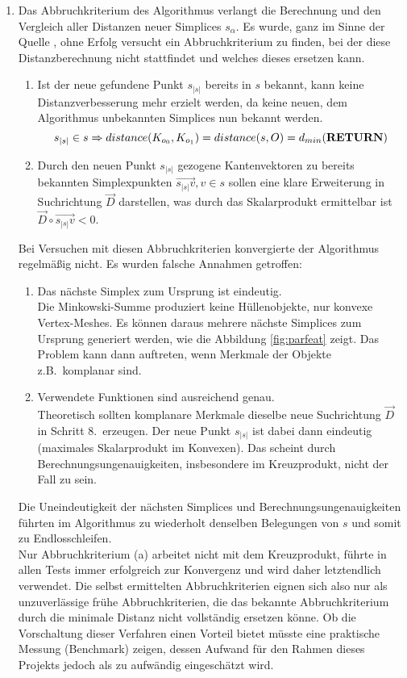 \begin{enumerate}
\item Das Abbruchkriterium des Algorithmus verlangt die Berechnung und den Vergleich aller Distanzen neuer Simplices $s_{\alpha}$. Es wurde, ganz im Sinne der Quelle \cite{gjk-casey}, ohne Erfolg versucht ein Abbruchkriterium zu finden, bei der diese Distanzberechnung nicht stattfindet und welches dieses ersetzen kann.
\begin{enumerate}
	\item Ist der neue gefundene Punkt $s_{|s|}$ bereits in $s$ bekannt, kann keine Distanzverbesserung mehr erzielt werden, da keine neuen, dem Algorithmus unbekannten Simplices nun bekannt werden.
	 $$s_{|s|} \in s \Rightarrow distance(K_{o_0}, K_{o_1}) = distance(s, O) = d_{min}\text{(\textbf{RETURN})}$$ 
	\item Durch den neuen Punkt $s_{|s|}$ gezogene Kantenvektoren zu bereits bekannten Simplexpunkten $\vec{s_{|s|}v}, v\in s$ sollen eine klare Erweiterung in Suchrichtung $\vec{D}$ darstellen, was durch das Skalarprodukt ermittelbar ist $\vec{D} \circ \vec{s_{|s|}v} < 0$.
\end{enumerate}

Bei Versuchen mit diesen Abbruchkriterien konvergierte der Algorithmus regelmäßig nicht. Es wurden falsche Annahmen getroffen:
\begin{enumerate}
\item Das nächste Simplex zum Ursprung ist eindeutig.\\
Die Minkowski-Summe produziert keine Hüllenobjekte, nur konvexe Vertex-Meshes. Es können daraus mehrere nächste Simplices zum Ursprung generiert werden, wie die Abbildung \ref{fig:parfeat} zeigt. Das Problem kann dann auftreten, wenn Merkmale der Objekte z.B.~komplanar sind.
\item Verwendete Funktionen sind ausreichend genau.\\
Theoretisch sollten komplanare Merkmale dieselbe neue Suchrichtung $\vec{D}$ in Schritt 8.~erzeugen. Der neue Punkt $s_{|s|}$ ist dabei dann eindeutig (maximales Skalarprodukt im Konvexen). Das scheint durch Berechnungsungenauigkeiten, insbesondere im Kreuzprodukt, nicht der Fall zu sein. 
\end{enumerate}

Die Uneindeutigkeit der nächsten Simplices und Berechnungsungenauigkeiten führten im Algorithmus zu wiederholt denselben Belegungen von $s$ und somit zu Endlosschleifen.\\
Nur Abbruchkriterium (a) arbeitet nicht mit dem Kreuzprodukt, führte in allen Tests immer erfolgreich zur Konvergenz und wird daher letztendlich verwendet.
Die selbst ermittelten Abbruchkriterien eignen sich also nur als unzuverlässige frühe Abbruchkriterien, die das bekannte Abbruchkriterium durch die minimale Distanz nicht vollständig ersetzen könne. Ob die Vorschaltung dieser Verfahren einen Vorteil bietet müsste eine praktische Messung (Benchmark) zeigen, dessen Aufwand für den Rahmen dieses Projekts jedoch als zu aufwändig eingeschätzt wird.
\end{enumerate}

